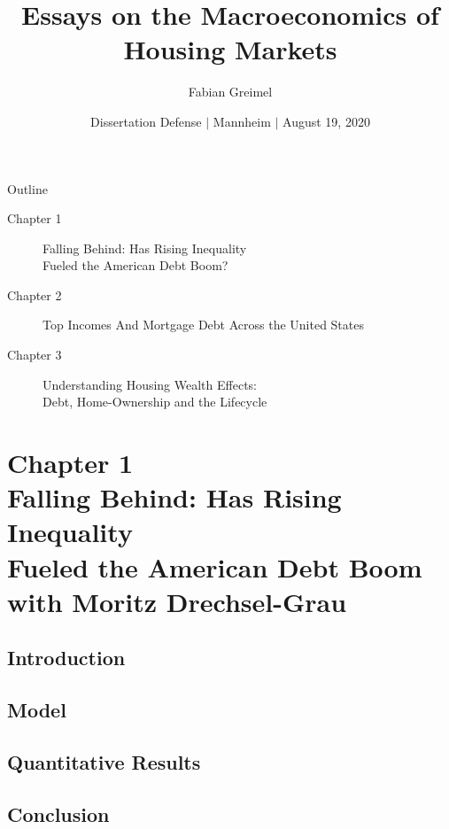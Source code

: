 \documentclass[aspectratio=169,mathserif,xcolor=dvipsnames]{beamer}
\title{Essays on the Macroeconomics of Housing Markets}
\author{Fabian Greimel}
\institute[U Mannheim]{\vspace{-10pt} University of Mannheim}
\date{\vspace{10pt} Dissertation Defense $|$ Mannheim  $|$ August 19, 2020}
\begin{document}
 
 \frame[plain]{\maketitle}


 \begin{frame}{Outline}

   \begin{description}
   \item[Chapter 1] Falling Behind: Has Rising Inequality \\ Fueled the American Debt Boom?
   \item[Chapter 2] Top Incomes And Mortgage Debt Across the United States
   \item[Chapter 3] Understanding Housing Wealth Effects: \\ Debt, Home-Ownership and the Lifecycle
   \end{description}
 \end{frame}
 
 \section{Chapter 1 \\ Falling Behind: Has Rising Inequality \\ Fueled the American Debt Boom \\ \footnotesize{with Moritz Drechsel-Grau}}

 \subsection{Introduction}
 
 
 
 \subsection{Model}
 
 \subsection{Quantitative Results}
 
 \subsection{Conclusion}
 
\end{document}
